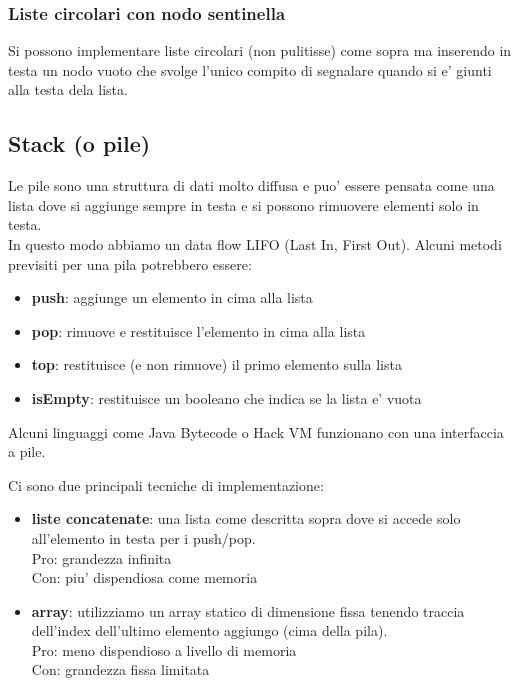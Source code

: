 \documentclass{article}
\begin{document}
\subsubsection{Liste circolari con nodo sentinella}

Si possono implementare liste circolari (non pulitisse) come sopra ma inserendo in
testa un nodo vuoto che svolge l'unico compito di segnalare quando si e' giunti alla testa dela lista.

\subsection{Stack (o pile)}

Le pile sono una struttura di dati molto diffusa e puo' essere pensata come una
lista dove si aggiunge sempre in testa e si possono rimuovere elementi solo in testa. \\
In questo modo abbiamo un data flow LIFO (Last In, First Out).
Alcuni metodi previsiti per una pila potrebbero essere: 

\begin{itemize}
  \item \textbf{push}: aggiunge un elemento in cima alla lista
  \item \textbf{pop}: rimuove e restituisce l'elemento in cima alla lista
  \item \textbf{top}: restituisce (e non rimuove) il primo elemento sulla lista
  \item \textbf{isEmpty}: restituisce un booleano che indica se la lista e' vuota
\end{itemize}

Alcuni linguaggi come Java Bytecode o Hack VM funzionano con una interfaccia a pile.

Ci sono due principali tecniche di implementazione:
\begin{itemize}
  \item \textbf{liste concatenate}: una lista come descritta sopra dove si
    accede solo all'elemento in testa per i push/pop. \\
    Pro: grandezza infinita \\
    Con: piu' dispendiosa come memoria
  \item \textbf{array}: utilizziamo un array statico di dimensione fissa tenendo
    traccia dell'index dell'ultimo elemento aggiungo (cima della pila). \\
    Pro: meno dispendioso a livello di memoria \\
    Con: grandezza fissa limitata
\end{itemize}
\end{document}
